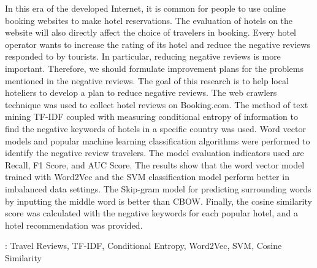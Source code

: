 In this era of the developed Internet, it is common for people to use online booking websites to make hotel reservations. The evaluation of hotels on the website will also directly affect the choice of travelers in booking. Every hotel operator wants to increase the rating of its hotel and reduce the negative reviews responded to by tourists. In particular, reducing negative reviews is more important. Therefore, we should formulate improvement plans for the problems mentioned in the negative reviews. The goal of this research is to help local hoteliers to develop a plan to reduce negative reviews. The web crawlers technique was used to collect hotel reviews on Booking.com. The method of text mining TF-IDF coupled with measuring conditional entropy of information to find the negative keywords of hotels in a specific country was used. Word vector models and popular machine learning classification algorithms were performed to identify the negative review travelers. The model evaluation indicators used are Recall, F1 Score, and AUC Score. The results show that the word vector model trained with Word2Vec and the SVM classification model perform better in imbalanced data settings. The Skip-gram model for predicting surrounding words by inputting the middle word is better than CBOW. Finally, the cosine similarity score was calculated with the negative keywords for each popular hotel, and a hotel recommendation was provided.

: Travel Reviews, TF-IDF, Conditional Entropy, Word2Vec, SVM, Cosine Similarity

%



